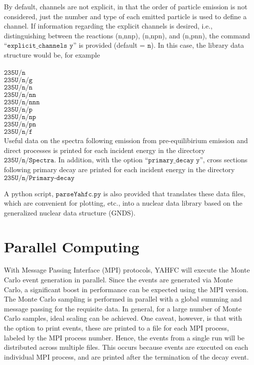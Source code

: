 \documentclass[
10pt,
showpacs,preprintnumbers,footinbib,
amsfonts,amsmath,amssymb,
aps,
prc,twocolumn,groupedaddress,superscriptaddress,
showkeys,
nofootinbib
]{revtex4-1}
\begin{document}
By default, channels are not explicit, in that the order of particle emission is not considered, just the number and type of each emitted particle is used to define a channel. If information regarding the explicit channels is desired, i.e., distinguishing between the reactions (n,nnp), (n,npn), and (n,pnn), the command ``${\texttt{explicit\_channels y}}$'' is provided (default = ${\texttt{n}}$). In this case, the library data structure would be, for example\\
\\
${\texttt{235U/n}}$\\
${\texttt{235U/n/g}}$\\
${\texttt{235U/n/n}}$\\
${\texttt{235U/n/nn}}$\\
${\texttt{235U/n/nnn}}$\\
${\texttt{235U/n/p}}$\\
${\texttt{235U/n/np}}$\\
${\texttt{235U/n/pn}}$\\
${\texttt{235U/n/f}}$\\

Useful data on the spectra following emission from pre-equilibirium emission and direct processes is printed for each incident energy in the directory ${\texttt{235U/n/Spectra}}$. In addition, with the option ``${\texttt{primary\_decay y}}$'', cross sections following primary decay are printed for each incident energy in the directory ${\texttt{235U/n/Primary-decay}}$

A python script, ${\texttt{parseYahfc.py}}$ is also provided that translates these data files, which are convenient for plotting, etc., into a nuclear data library based on the generalized nuclear data structure (GNDS).

\section{Parallel Computing}

With Message Passing Interface (MPI) protocols, YAHFC will execute the Monte Carlo event generation in parallel. Since the events are generated via Monte Carlo, a significant boost in performance can be expected using the MPI version. The Monte Carlo sampling is performed in parallel with a global summing and message passing for the requisite data. In general, for a large number of Monte Carlo samples, ideal scaling can be achieved. One caveat, however, is that with the option to print events, these are printed to a file for each MPI process, labeled by the MPI process number. Hence, the events from a single run will be distributed across multiple files. This occurs because events are executed on each individual MPI process, and are printed after the termination of the decay event. 
\end{document}
